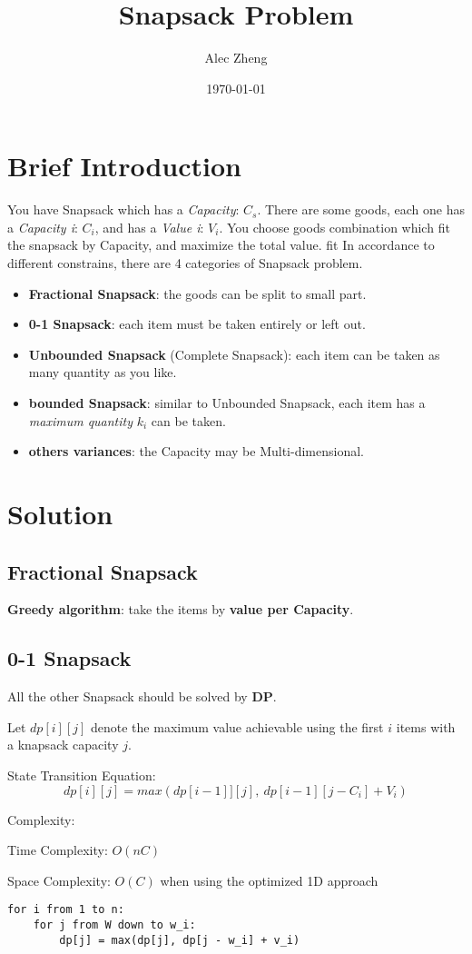 \documentclass{article}
\title{Snapsack Problem}
\author{Alec Zheng}
\date{\today}
\begin{document}
\maketitle
\tableofcontents


\section{Brief Introduction}
You have Snapsack which has a \textit{Capacity}: $C_s$. There are some goods, each one has a \textit{Capacity i}:  $C_i$, and has a \textit{Value i}:  $V_i$. 
You choose goods combination which fit the snapsack by Capacity, and maximize the total value.
fit  
In accordance to different constrains, there are 4 categories of Snapsack problem.
\begin{itemize}
    \item \textbf{Fractional Snapsack}: the goods can be split to small part. 
    \item \textbf{0-1 Snapsack}: each item must be taken entirely or left out.
    \item \textbf{Unbounded Snapsack} (Complete Snapsack): each item can be taken as many quantity as you like. 
    \item \textbf{bounded Snapsack}: similar to Unbounded Snapsack, each item has a \textit{maximum quantity} $k_i$ can be taken.
    \item \textbf{others variances}: the Capacity may be Multi-dimensional.
\end{itemize}

\section{Solution}
\subsection{Fractional Snapsack}
\textbf{Greedy algorithm}: take the items by \textbf{value per Capacity}.
\subsection{0-1 Snapsack}
All the other Snapsack should be solved by \textbf{DP}. 

Let $ dp[i][j] $ denote the maximum value achievable using the first $i$ items with a knapsack capacity $j$.

State Transition Equation:
\[
dp[i][j] = max(dp[i-1]][j],\ dp[i - 1][j - C_i] + V_i)
\]

Complexity:


Time Complexity: $\mathit{O}(nC)$

Space Complexity: $\mathit{O}(C) $ when using the optimized 1D approach
\begin{verbatim}
for i from 1 to n:
    for j from W down to w_i:
        dp[j] = max(dp[j], dp[j - w_i] + v_i)

\end{verbatim}
\end{document}
